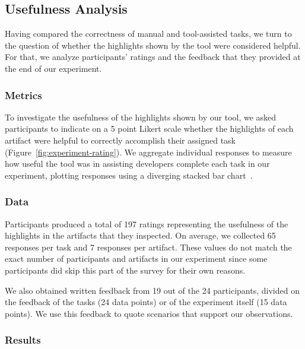 

\subsection{Usefulness Analysis}
\label{cp6:usefulness}



Having compared the correctness of manual and tool-assisted tasks,
we turn to the question of 
whether the highlights shown by the tool were considered helpful. 
For that, we analyze participants' ratings and the feedback that they 
provided at the end of our experiment.


\subsubsection{Metrics}

To investigate the usefulness of the highlights shown by our tool, we asked participants to indicate on a 5 point Likert scale whether the highlights
of each artifact were helpful to correctly accomplish their assigned task (Figure~\ref{fig:experiment-rating}). We aggregate individual responses to measure how useful the tool was in assisting developers complete each task in our experiment, plotting responses using a diverging stacked bar chart~\cite{spence2001info-viz}.



\subsubsection{Data}


Participants produced a total of 197 ratings representing the usefulness of the highlights in the artifacts that they inspected.
On average, we collected 65 responses per task and 7 responses per artifact.  
These values do not match the exact number of participants and artifacts in our experiment since some participants did skip this part of 
the survey for their own reasons.


We also obtained written feedback from 19 out of the 24 participants, divided on the feedback of the tasks (24 data points)
or of the experiment itself (15 data points). We use this feedback to quote scenarios
that support our observations.



\subsubsection{Results}


